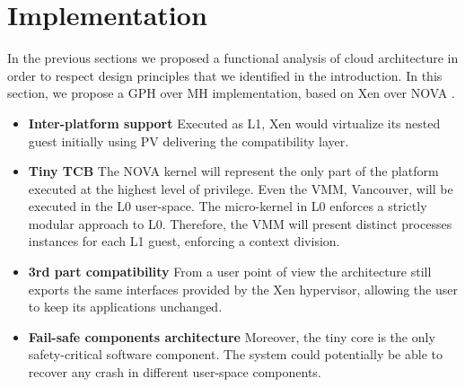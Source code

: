 \documentclass{sig-alternate}
\begin{document}
\section{Implementation}
In the previous sections we proposed a functional analysis of cloud architecture in order to respect design principles that we identified in the introduction. In this section, we propose a GPH over MH implementation, based on Xen over NOVA \cite{nova}.


\begin{itemize}[]
\item \textbf{Inter-platform support} Executed as L1, Xen would virtualize its nested guest initially using PV delivering the compatibility layer.
\item \textbf{Tiny TCB} The NOVA kernel will represent the only part of the platform executed at the highest level of privilege. Even the VMM, Vancouver, will be executed in the L0 user-space. The micro-kernel in L0 enforces a strictly modular approach to L0. Therefore, the VMM will present distinct processes instances for each L1 guest, enforcing a context division.
\item \textbf{3rd part compatibility} From a user point of view the architecture still exports the same interfaces provided by the Xen hypervisor, allowing the user to keep its applications unchanged.
\item \textbf{Fail-safe components architecture} Moreover, the tiny core is the only safety-critical software component. The system could potentially be able to recover any crash in different user-space components.
\end{itemize}
\end{document}
